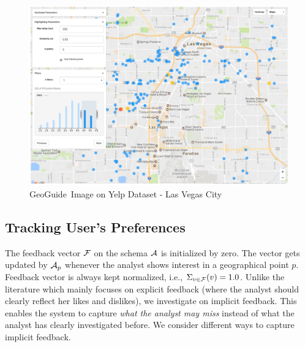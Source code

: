 \documentclass[conference,compsoc]{IEEEtran}
\newcommand{\framework}{{\sc GeoGuide}}
\begin{document}
\begin{figure}[t]
	\centering
	\includegraphics[width=5in]{figs/yelp}
	\caption{\framework\ Image on Yelp Dataset - Las Vegas City}
	\label{fig:yelp}
	\vspace{-10pt}
\end{figure}


\subsection{Tracking  User's Preferences }

The feedback vector ${\cal F}$ on the schema ${\cal A}$ is initialized by zero. The vector gets updated by ${\cal A}_p$ whenever the analyst shows interest in a geographical point $p$. Feedback vector is always kept normalized, i.e., $\Sigma_{v \in {\cal F}}(v) = 1.0$. Unlike the literature which mainly focuses on explicit feedback (where the analyst should clearly reflect her likes and dislikes), we investigate on implicit feedback. This enables the system to capture {\em what the analyst may miss} instead of what the analyst has clearly investigated before. We consider different ways to capture implicit feedback.
\end{document}
